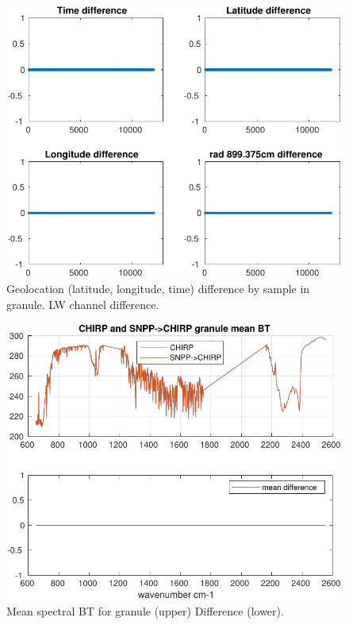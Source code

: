\documentclass[11pt]{article}
\begin{document}
\begin{figure}[htbp]
\centering
\includegraphics[width=.9\linewidth]{./figs/2020d001g238_geo_diff_snpp.pdf}
\caption{\label{fig:org683ff56}
Geolocation (latitude, longitude, time) difference by sample in granule. LW channel difference.}
\end{figure}

\begin{figure}[htbp]
\centering
\includegraphics[width=.9\linewidth]{./figs/2020d001g238_bt_spectrum_mean.pdf}
\caption{\label{fig:orgabe0f66}
Mean spectral BT for granule (upper) Difference (lower).}
\end{figure}
\end{document}
